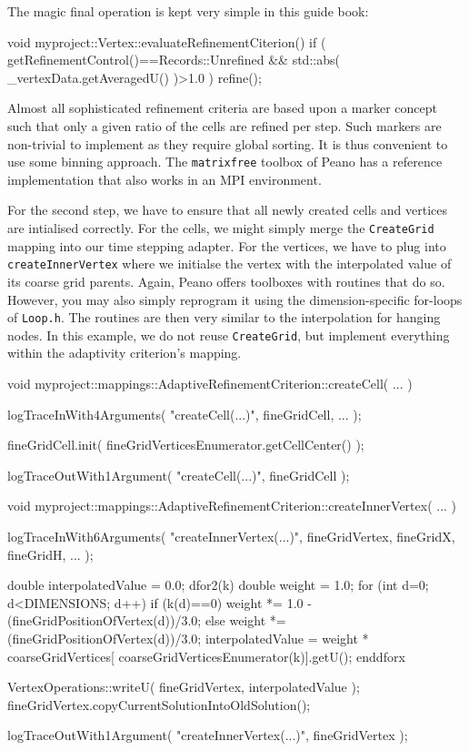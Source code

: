 \noindent
The magic final operation is kept very simple in this guide book:

\begin{code}
void myproject::Vertex::evaluateRefinementCiterion() {
 if (
  getRefinementControl()==Records::Unrefined
  &&
  std::abs( _vertexData.getAveragedU() )>1.0
 ) {
   refine();
 }
}
\end{code}

\begin{remark}
Almost all sophisticated refinement criteria are based upon a marker concept
such that only a given ratio of the cells are refined per step. 
Such markers are non-trivial to implement as they require global sorting.
It is thus convenient to use some binning approach.
The \texttt{matrixfree} toolbox of Peano has a reference implementation that
also works in an MPI environment.
\end{remark}

For the second step, we have to ensure that all newly created cells and vertices
are intialised correctly.
For the cells, we might simply merge the \texttt{CreateGrid} mapping into our
time stepping adapter.
For the vertices, we have to plug into \texttt{createInnerVertex} where we
initialse the vertex with the interpolated value of its coarse grid parents.
Again, Peano offers toolboxes with routines that do so. 
However, you may also simply reprogram it using the dimension-specific for-loops
of \texttt{Loop.h}.
The routines are then very similar to the interpolation for hanging nodes.
In this example, we do not reuse \texttt{CreateGrid}, but implement everything
within the adaptivity criterion's mapping.

\begin{code}
void myproject::mappings::AdaptiveRefinementCriterion::createCell( ... ) {
  logTraceInWith4Arguments( "createCell(...)", fineGridCell, ... );

  fineGridCell.init( fineGridVerticesEnumerator.getCellCenter() );

  logTraceOutWith1Argument( "createCell(...)", fineGridCell );
}


void myproject::mappings::AdaptiveRefinementCriterion::createInnerVertex( ... ) {
  logTraceInWith6Arguments( "createInnerVertex(...)", fineGridVertex, fineGridX, fineGridH, ... );

  double interpolatedValue = 0.0;
  dfor2(k)
    double weight = 1.0;
    for (int d=0; d<DIMENSIONS; d++) {
      if (k(d)==0) {
        weight *= 1.0 - (fineGridPositionOfVertex(d))/3.0;
      }
      else {
        weight *= (fineGridPositionOfVertex(d))/3.0;
      }
    }
    interpolatedValue = weight * coarseGridVertices[ coarseGridVerticesEnumerator(k)].getU();
  enddforx

  VertexOperations::writeU( fineGridVertex, interpolatedValue );
  fineGridVertex.copyCurrentSolutionIntoOldSolution();

  logTraceOutWith1Argument( "createInnerVertex(...)", fineGridVertex );
}
\end{code}

